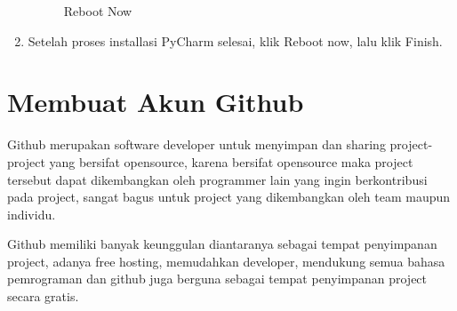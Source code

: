 \begin{enumerate}
\begin{figure}[H]
\caption{Reboot Now}
\label{installpycharm6}
\end{figure}
\item Setelah proses installasi PyCharm selesai, klik Reboot now, lalu klik Finish.
\end{enumerate}

\section{Membuat Akun Github}
Github merupakan software developer untuk menyimpan dan sharing project-project yang bersifat opensource, karena bersifat opensource maka project tersebut dapat dikembangkan oleh programmer lain yang ingin berkontribusi pada project, sangat bagus untuk project yang dikembangkan oleh team maupun individu. 

Github memiliki banyak keunggulan diantaranya sebagai tempat penyimpanan project, adanya free hosting, memudahkan developer, mendukung semua bahasa pemrograman dan github juga berguna sebagai tempat penyimpanan project secara gratis.

